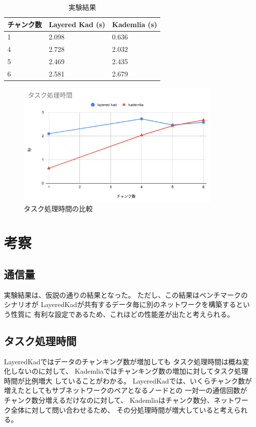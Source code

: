 \documentclass[sotsuron]{jcsie}
\begin{document}
\begin{table}[H]
	\caption{実験結果}	
	\centering
	\label{table:calc-result}
	\begin{tabular}{|l|l|l|}
		\hline
		チャンク数 &   
		Layered Kad (s) &   
		Kademlia (s)\\ 
		\hline
		1               &   
		2.098           &   
		0.636\\
		\hline
		4               &   
		2.728           &   
		2.032\\
		\hline
		5               &   
		2.469           &   
		2.435\\
		\hline
		6               &   
		2.581           &   
		2.679\\
		\hline
	\end{tabular}	
\end{table}

\begin{figure}[H]
	\centering
	\includegraphics[width=10cm]{./assets/image/calc_compare.png}
	\caption{タスク処理時間の比較}
	\label{fig:calc_compare.png}
\end{figure}

\section{考察}
\subsection{通信量}
実験結果は、仮説の通りの結果となった。
ただし、この結果はベンチマークのシナリオが
LayeredKadが共有するデータ毎に別のネットワークを構築するという性質に
有利な設定であるため、これほどの性能差が出たと考えられる。
\subsection{タスク処理時間}
LayeredKadではデータのチャンキング数が増加しても
タスク処理時間は概ね変化しないのに対して、
Kademliaではチャンキング数の増加に対してタスク処理時間が比例増大
していることがわかる。
LayeredKadでは、いくらチャンク数が増えたとしてもサブネットワークのペアとなるノードとの
一対一の通信回数がチャンク数分増えるだけなのに対して、
Kademliaはチャンク数分、ネットワーク全体に対して問い合わせるため、
その分処理時間が増大していると考えられる。
\end{document}
